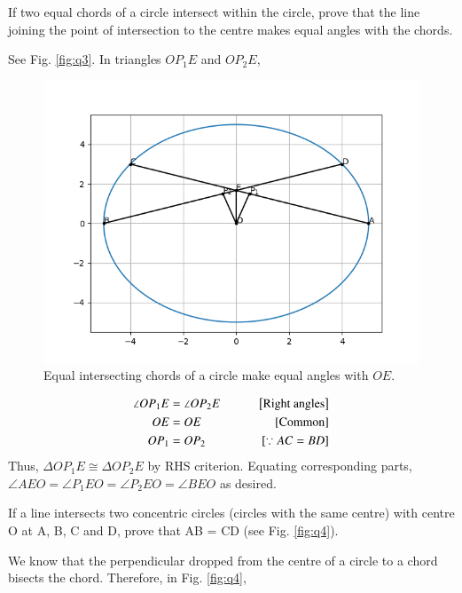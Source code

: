 \documentclass[journal,12pt,twocolumn]{IEEEtran}
\begin{document}
\problem If two equal chords of a circle intersect within the circle, prove 
that the line joining the point of intersection to the centre makes equal 
angles with the chords.

\solution See Fig. \eqref{fig:q3}. In triangles $OP_1E$ and $OP_2E$,

\begin{figure}[!ht]
    \centering
    \includegraphics[width=\columnwidth]{figs/10_4_3.png}
    \caption{Equal intersecting chords of a circle make equal angles with $OE$.}
    \label{fig:q3}
\end{figure}

\begin{align}
    \angle{OP_1E} &= \angle{OP_2E} \qquad &{}\left[\text{Right angles}\right] \\
    OE &= OE \qquad &{}\left[\text{Common}\right] \\
    OP_1 &= OP_2 \qquad &{}\left[\because AC = BD\right]
\end{align}
Thus, $\Delta OP_1E \cong \Delta OP_2E$ by RHS criterion. Equating 
corresponding parts, $\angle{AEO} = \angle{P_1EO} = \angle{P_2EO} = \angle{BEO}$
as desired.

\problem If a line intersects two concentric circles (circles with the same 
centre) with centre O at A, B, C and D, prove that AB = CD (see Fig. \eqref{fig:q4}).

\solution We know that the perpendicular dropped from the centre of a circle to a
chord bisects the chord. Therefore, in Fig. \eqref{fig:q4},
\end{document}
